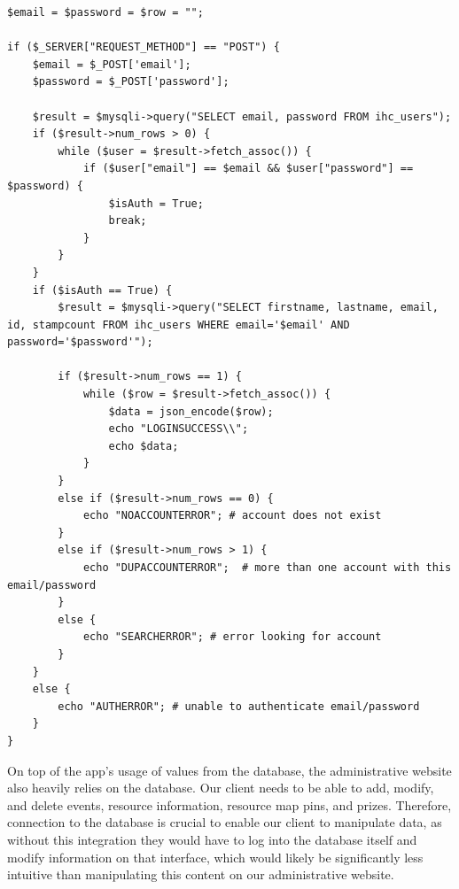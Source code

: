 \documentclass[onecolumn, draftclsnofoot,10pt, compsoc]{IEEEtran}
\begin{document}
		\begin{lstlisting}[style=php]
$email = $password = $row = "";

if ($_SERVER["REQUEST_METHOD"] == "POST") {
	$email = $_POST['email'];
	$password = $_POST['password'];

	$result = $mysqli->query("SELECT email, password FROM ihc_users");
	if ($result->num_rows > 0) {
		while ($user = $result->fetch_assoc()) {
			if ($user["email"] == $email && $user["password"] == $password) {
				$isAuth = True;
				break;
			}
		}
	}
	if ($isAuth == True) {
		$result = $mysqli->query("SELECT firstname, lastname, email, id, stampcount FROM ihc_users WHERE email='$email' AND password='$password'");

		if ($result->num_rows == 1) {
			while ($row = $result->fetch_assoc()) {
				$data = json_encode($row);
				echo "LOGINSUCCESS\\";
				echo $data;
			}
		}
		else if ($result->num_rows == 0) {
			echo "NOACCOUNTERROR"; # account does not exist
		}
		else if ($result->num_rows > 1) {
			echo "DUPACCOUNTERROR";  # more than one account with this email/password
		}
		else {
			echo "SEARCHERROR"; # error looking for account
		}
	}
	else {
		echo "AUTHERROR"; # unable to authenticate email/password
	}
}
		\end{lstlisting}
		\newpage

		On top of the app’s usage of values from the database, the administrative website also heavily relies on the database. Our client needs to be able to add, modify, and delete events, resource information, resource map pins, and prizes. Therefore, connection to the database is crucial to enable our client to manipulate data, as without this integration they would have to log into the database itself and modify information on that interface, which would likely be significantly less intuitive than manipulating this content on our administrative website.
\end{document}
